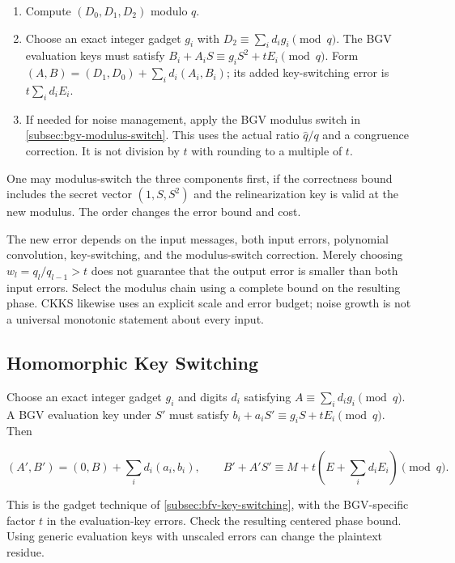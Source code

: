 \begin{tcolorbox}[title={\textbf{\tboxlabel{\ref*{subsec:bgv-mult-cipher}} BGV Ciphertext-to-Ciphertext Multiplication}}]
\begin{enumerate}
\item Compute $(D_0,D_1,D_2)$ modulo $q$.
\item Choose an exact integer gadget $g_i$ with $D_2\equiv\sum_i d_ig_i\pmod q$. The BGV evaluation keys must satisfy $B_i+A_iS\equiv g_iS^2+tE_i\pmod q$. Form $(A,B)=(D_1,D_0)+\sum_i d_i(A_i,B_i)$; its added key-switching error is $t\sum_i d_iE_i$.
\item If needed for noise management, apply the BGV modulus switch in \autoref{subsec:bgv-modulus-switch}. This uses the actual ratio $\widehat q/q$ and a congruence correction. It is not division by $t$ with rounding to a multiple of $t$.
\end{enumerate}
 One may modulus-switch the three components first, if the correctness bound includes the secret vector $(1,S,S^2)$ and the relinearization key is valid at the new modulus. The order changes the error bound and cost.
\end{tcolorbox}

 The new error depends on the input messages, both input errors, polynomial convolution, key-switching, and the modulus-switch correction. Merely choosing $w_l=q_l/q_{l-1}>t$ does not guarantee that the output error is smaller than both input errors. Select the modulus chain using a complete bound on the resulting phase. CKKS likewise uses an explicit scale and error budget; noise growth is not a universal monotonic statement about every input.


\subsection{Homomorphic Key Switching}
\label{subsec:bgv-key-switching}

Choose an exact integer gadget $g_i$ and digits $d_i$ satisfying $A\equiv\sum_i d_ig_i\pmod q$. A BGV evaluation key under $S'$ must satisfy $b_i+a_iS'\equiv g_iS+tE_i\pmod q$. Then
\begin{tcolorbox}[title={\textbf{\tboxlabel{\ref*{subsec:bgv-key-switching}} BGV Key Switching}}]
\[
(A',B')=(0,B)+\sum_i d_i(a_i,b_i),\qquad
B'+A'S'\equiv M+t\left(E+\sum_i d_iE_i\right)\pmod q.
\]
\end{tcolorbox}
This is the gadget technique of \autoref{subsec:bfv-key-switching}, with the BGV-specific factor $t$ in the evaluation-key errors. Check the resulting centered phase bound. Using generic evaluation keys with unscaled errors can change the plaintext residue.

